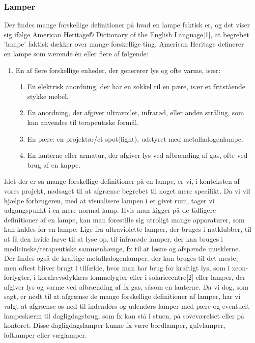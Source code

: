 \subsubsection{Lamper}
Der findes mange forskellige definitioner på hvad en lampe faktisk er, og det viser sig ifølge American Heritage® Dictionary of the English Language[1], at begrebet ’lampe’ faktisk dækker over mange forskellige ting. American Heritage definerer en lampe som værende én eller flere af følgende:
\begin{enumerate}
    \item En af flere forskellige enheder, der genererer lys og ofte varme, især:
    \begin{enumerate}
        \item En elektrisk anordning, der har en sokkel til en pære, især et fritstående stykke møbel.
        \item En anordning, der afgiver ultravoilet, infrarød, eller anden stråling, som kan anvendes til terapeutiske formål.
        \item En pære: en projektør/et spot(light), udstyret med metalhalogenlampe.
        \item En lanterne eller armatur, der afgiver lys ved afbrænding af gas, ofte ved brug af en kappe.
    \end{enumerate}
\end{enumerate}
Idet der er så mange forskellige definitioner på en lampe, er vi, i konteksten af vores projekt, nødsaget til at afgrænse begrebet til noget mere specifikt. Da vi vil hjælpe forbrugeren, med at visualisere lampen i et givet rum, tager vi udgangspunkt i en mere normal lamp. Hvis man kigger på de tidligere definitioner af en lampe, kan man forestille sig utroligt mange apparaturer, som kan kaldes for en lampe. Lige fra ultraviolette lamper, der bruges i natklubber, til at få den hvide farve til at lyse op, til infrarøde lamper, der kan bruges i medicinske/terapeutiske sammenhænge, fx til at løsne og afspænde musklerne. Der findes også de kraftige metalhalogenlamper, der kan bruges til det meste, men oftest bliver brugt i tilfælde, hvor man har brug for kraftigt lys, som i xeon-forlygter, i koralrevsdykkers lommelygter eller i solariecentre[2] eller lamper, der afgiver lys og varme ved afbrænding af fx gas, såsom en lanterne. Da vi dog, som sagt, er nødt til at afgrænse de mange forskellige definitioner af lamper, har vi valgt at afgrænse os ned til indendørs og udendørs lamper med pære og eventuelt lampeskærm til dagligdagsbrug, som fx kan stå i stuen, på soveværelset eller på kontoret. Disse dagligdagslamper kunne fx være bordlamper, gulvlamper, loftlamper eller væglamper.


